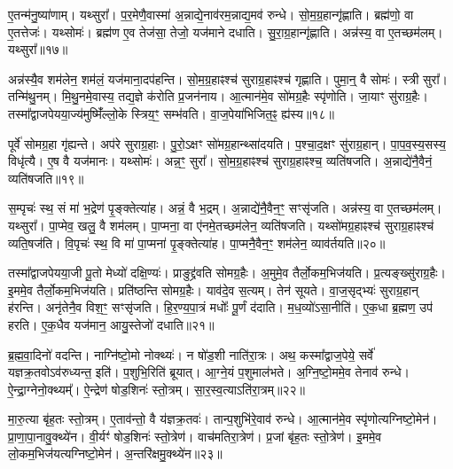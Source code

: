 ए॒तन्म॑नु॒ष्या॑णाम्।
यथ्सुरा᳚।
प॒र॒मेणै॒वास्मा॑ अ॒न्नाद्ये॒नाव॑र\-म॒न्नाद्य॒मव॑ रुन्धे।
सो॒म॒ग्र॒हान्गृ॑ह्णाति।
ब्रह्म॑णो॒ वा ए॒तत्तेजः॑।
यथ्सोमः॑।
ब्रह्म॑ण ए॒व तेज॑सा॒ तेजो॒ यज॑माने दधाति।
सु॒रा॒ग्र॒हान्गृ॑ह्णाति।
अन्न॑स्य॒ वा ए॒तच्छम॑लम्।
यथ्सुरा᳚॥१७॥\ip

अन्न॑स्यै॒व शम॑लेन॒ शम॑लं॒ यज॑माना॒दप॑हन्ति।
सो॒म॒ग्र॒हाꣴश्च॑ सुराग्र॒हाꣴश्च॑ गृह्णाति।
पुमा॒न्॒ वै सोमः॑।
स्त्री सुरा᳚।
तन्मि॑थु॒नम्।
मि॒थु॒नमे॒वास्य॒ तद्य॒ज्ञे क॑रोति प्र॒जन॑नाय।
आ॒त्मान॑मे॒व सो॑मग्र॒हैः स्पृ॑णोति।
जा॒याꣳ सु॑राग्र॒हैः।
तस्मा᳚द्वाजपेयया॒ज्य॑मुष्मिँ॑ल्लो॒के स्त्रिय॒ꣳ॒ सम्भ॑वति।
वा॒ज॒पेया॑भिजित॒ꣴ॒ ह्य॑स्य॥१८॥\ip

पूर्वे॑ सोमग्र॒हा गृ॑ह्यन्ते।
अप॑रे सुराग्र॒हाः।
पु॒रो॒\-ऽक्षꣳ सो॑मग्र॒हान्थ्सा॑दयति।
प॒श्चा॒द॒क्षꣳ सु॑राग्र॒हान्।
पा॒प॒व॒स्य॒सस्य॒ विधृ॑त्यै।
ए॒ष वै यज॑मानः।
यथ्सोमः॑।
अन्न॒ꣳ॒ सुरा᳚।
सो॒म॒ग्र॒हाꣴश्च॑ सुराग्र॒हाꣴश्च॒ व्यति॑षजति।
अ॒न्नाद्ये॑नै॒वैनं॒ व्यति॑षजति॥१९॥\ip

स॒म्पृचः॑ स्थ॒ सं मा॑ भ॒द्रेण॑ पृ॒ङ्क्तेत्या॑ह।
अन्नं॒ वै भ॒द्रम्।
अ॒न्ना\-द्ये॑नै॒वैन॒ꣳ॒ सꣳसृ॑जति।
अन्न॑स्य॒ वा ए॒तच्छम॑लम्।
यथ्सुरा᳚।
पा॒प्मेव॒ खलु॒ वै शम॑लम्।
पा॒प्मना॒ वा ए॑नमे॒तच्छम॑लेन॒ व्यति॑षजति।
यथ्सो॑मग्र॒हाꣴश्च॑ सुराग्र॒हाꣴश्च॑ व्यति॒षज॑ति।
वि॒पृचः॑ स्थ॒ वि मा॑ पा॒प्मना॑ पृ॒ङ्क्तेत्या॑ह।
पा॒प्मनै॒वैन॒ꣳ॒ शम॑लेन॒ व्याव॑र्तयति॥२०॥\ip

तस्मा᳚द्वाजपेयया॒जी पू॒तो मेध्यो॑ दक्षि॒ण्यः॑।
प्राङुद्द्र॑वति सोम\-ग्र॒हैः।
अ॒मुमे॒व तैर्लो॒क\-म॒भि\-ज॑यति।
प्र॒त्यङ्ख्सु॑राग्र॒हैः।
इ॒ममे॒व तैर्लो॒कम॒भि\-ज॑यति।
प्रति॑\-ष्ठन्ति सोमग्र॒हैः।
याव॑दे॒व स॒त्यम्।
तेन॑ सूयते।
वा॒ज॒सृद्भ्यः॑ सुराग्र॒हान् ह॑रन्ति।
अनृ॑तेनै॒व विश॒ꣳ॒ सꣳ\-सृ॑जति।
हि॒र॒ण्य॒पा॒त्रं मधोः᳚ पू॒र्णं द॑दाति।
म॒ध॒व्यो॑\-ऽसा॒नीति॑।
ए॒क॒धा ब्र॒ह्मण॒ उप॑ हरति।
ए॒क॒धैव यज॑मान॒ आयु॒स्तेजो॑ दधाति॥२१॥\ip{}

ब्र॒ह्म॒वा॒दिनो॑ वदन्ति।
नाग्नि॑ष्टो॒मो नोक्थ्यः॑।
न षो॑ड॒शी नाति॑\-रा॒त्रः।
अथ॒ कस्मा᳚द्वाज॒पेये॒ सर्वे॑ यज्ञक्र॒तवो\-ऽव॑रुध्यन्त॒ इति॑।
प॒शुभि॒\-रिति॑ ब्रूयात्।
आ॒ग्ने॒यं प॒शुमाल॑भते।
अ॒ग्नि॒ष्टो॒ममे॒व तेनाव॑ रुन्धे।
ऐ॒न्द्रा॒ग्नेनो॒क्थ्यम्᳚।
ऐ॒न्द्रेण॑ षोड॒शिनः॑ स्तो॒त्रम्।
सा॒र॒स्व॒त्या\-ऽति॑रा॒त्रम्॥२२॥\ip

मा॒रु॒त्या बृ॑ह॒तः स्तो॒त्रम्।
ए॒ताव॑न्तो॒ वै य॑ज्ञक्र॒तवः॑।
तान्प॒शुभि॑रे॒वाव॑ रुन्धे।
आ॒त्मान॑मे॒व स्पृ॑णोत्यग्निष्टो॒मेन॑।
प्रा॒णा॒पा॒नावु॒क्थ्ये॑न।
वी॒र्यꣳ॑ षोड॒शिनः॑ स्तो॒त्रेण॑।
वाच॑मतिरा॒त्रेण॑।
प्र॒जां बृ॑ह॒तः स्तो॒त्रेण॑।
इ॒ममे॒व लो॒कम॒भिज॑यत्यग्निष्टो॒मेन॑।
अ॒न्तरि॑क्षमु॒क्थ्ये॑न॥२३॥\ip

